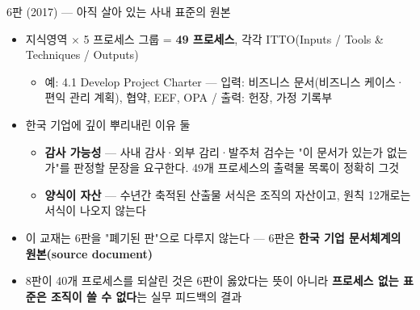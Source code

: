 \begin{frame}[allowframebreaks=1.0]{6판 (2017) — 아직 살아 있는 사내 표준의 원본}
\small
\begin{itemize}
\item{} 지식영역 $\times$ 5 프로세스 그룹 = \textbf{49 프로세스}, 각각 ITTO(Inputs / Tools \& Techniques / Outputs)
\par\nobreak
\begin{itemize}
\item\relax 예: 4.1 Develop Project Charter — 입력: 비즈니스 문서(비즈니스 케이스·편익 관리 계획), 협약, EEF, OPA / 출력: 헌장, 가정 기록부
\end{itemize}
\item\relax 한국 기업에 깊이 뿌리내린 이유 둘
\par\nobreak
\begin{itemize}
\item\relax \textbf{감사 가능성} — 사내 감사·외부 감리·발주처 검수는 "이 문서가 있는가 없는가"를 판정할 문장을 요구한다. 49개 프로세스의 출력물 목록이 정확히 그것
\item\relax \textbf{양식이 자산} — 수년간 축적된 산출물 서식은 조직의 자산이고, 원칙 12개로는 서식이 나오지 않는다
\end{itemize}
\item\relax 이 교재는 6판을 "폐기된 판"으로 다루지 않는다 — 6판은 \textbf{한국 기업 문서체계의 원본(source document)}
\item\relax 8판이 40개 프로세스를 되살린 것은 6판이 옳았다는 뜻이 아니라 \textbf{프로세스 없는 표준은 조직이 쓸 수 없다}는 실무 피드백의 결과
\end{itemize}
\end{frame}


